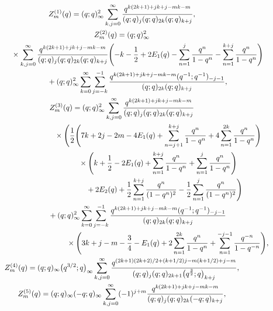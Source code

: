 \documentclass[pdftex]{sigma}
\numberwithin{equation}{section}
\begin{document}
\begin{gather}
 Z^{(1)}_{m}(q)
   =
 (q;q)_{\infty}^2\sum_{k,j=0}^{\infty}\frac{q^{k(2k+1)+jk+j-mk-m}}{(q;q)_{j}(q;q)_{2k}(q;q)_{k+j}},
\nonumber\\
 Z^{(2)}_{m}(q)
   =
 (q;q)_{\infty}^2\nonumber\\ \hphantom{Z^{(2)}_{m}(q)  =}{}
 \times\sum_{k,j=0}^{\infty}
 \frac{q^{k(2k+1)+jk+j-mk-m}}{(q;q)_{j}(q;q)_{2k}(q;q)_{k+j}}\Biggl(-k-\frac{1}{2}+2E_{1}(q)-\sum_{n=1}^{j}\frac{q^n}{1-q^n}-\sum_{n=1}^{k+j}\frac{q^n}{1-q^n}\Biggr)\nonumber\\ \hphantom{Z^{(2)}_{m}(q)  =}{}
  +(q;q)_{\infty}^2\sum_{k=0}^{\infty}\sum_{j=-k}^{-1}
 \frac{q^{k(2k+1)+jk+j-mk-m}(q^{-1};q^{-1})_{-j-1}}{(q;q)_{2k}(q;q)_{k+j}},\nonumber\\
 Z^{(3)}_{m}(q)
   =
 (q;q)_{\infty}^2\sum_{k,j=0}^{\infty}
 \frac{q^{k(2k+1)+jk+j-mk-m}}{(q;q)_{j}(q;q)_{2k}(q;q)_{k+j}}\nonumber\\ \hphantom{ Z^{(3)}_{m}(q)  = (q;q)_{\infty}^2\sum_{k,j=0}^{\infty}}{}
  \times\Biggl(\frac{1}{2}\Biggl(7k+2j-2m-4E_1(q)+\sum_{n=j+1}^{k+j}\frac{q^n}{1-q^n}+4\sum_{n=1}^{2k}\frac{q^n}{1-q^n}\Biggr)\nonumber\\ \hphantom{ Z^{(3)}_{m}(q)  = (q;q)_{\infty}^2\sum_{k,j=0}^{\infty}}{}
  \times\Biggl(k+\frac{1}{2}-2E_1(q)+\sum_{n=1}^{k+j}\frac{q^n}{1-q^n}+\sum_{n=1}^{j}\frac{q^n}{1-q^n}\Biggr)\nonumber\\ \hphantom{ Z^{(3)}_{m}(q)  = (q;q)_{\infty}^2\sum_{k,j=0}^{\infty}\times\Biggl(}{}
  +2E_2(q)+\frac{1}{2}\sum_{n=1}^{k+j}\frac{q^n}{(1-q^n)^2}-\frac{1}{2}\sum_{n=1}^{j}\frac{q^n}{(1-q^n)^2}\Biggr)\nonumber\\ \hphantom{ Z^{(3)}_{m}(q)  = }{}
  +(q;q)_{\infty}^2\sum_{k=0}^{\infty}\sum_{j=-k}^{-1}
 \frac{q^{k(2k+1)+jk+j-mk-m}(q^{-1};q^{-1})_{-j-1}}{(q;q)_{2k}(q;q)_{k+j}}\nonumber\\ \hphantom{ Z^{(3)}_{m}(q)  = (q;q)_{\infty}^2\sum_{k=0}^{\infty}\sum_{j=-k}^{-1}}{}
  \quad\times\Biggl(3k+j-m-\frac{3}{4}-E_1(q)+2\sum_{n=1}^{2k}\frac{q^n}{1-q^n}+\sum_{n=1}^{-j-1}\frac{q^{-n}}{1-q^{-n}}\Biggr),\nonumber\\
 Z^{(4)}_{m}(q)
   =
 (q;q)_{\infty}\bigl(q^{3/2};q\bigr)_{\infty}\sum_{k,j=0}^{\infty}\frac{q^{(2k+1)(2k+2)/2+(k+1/2)j-m(k+1/2)+j-m}}{(q;q)_{j}(q;q)_{2k+1}\bigl(q^{\frac{3}{2}};q\bigr)_{k+j}},\nonumber\\
 Z^{(5)}_{m}(q)
   =
 (q;q)_{\infty}(-q;q)_{\infty}\sum_{k,j=0}^{\infty}(-1)^{j+m}\frac{q^{k(2k+1)+jk+j-mk-m}}{(q;q)_{j}(q;q)_{2k}(-q;q)_{k+j}},\nonumber\\

\end{gather}
\end{document}
